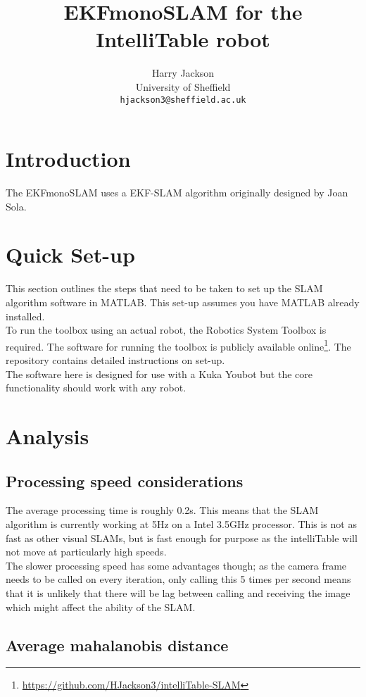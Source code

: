\documentclass[1pt, oneside]{article}
\title{EKFmonoSLAM for the IntelliTable robot}
\author{Harry Jackson
	\\University of Sheffield
	\\
	\texttt{hjackson3@sheffield.ac.uk}
	}
\begin{document}
\maketitle
\tableofcontents
\clearpage
\section{Introduction}
The EKFmonoSLAM uses a EKF-SLAM algorithm originally designed by Joan Sola\cite{sola2012impact, sola2008fusing}.
\section{Quick Set-up}
This section outlines the steps that need to be taken to set up the SLAM algorithm software in MATLAB. This set-up assumes you have MATLAB already installed.
\\

To run the toolbox using an actual robot, the Robotics System Toolbox is required. The software for running the toolbox is publicly available online\footnote{\url{https://github.com/HJackson3/intelliTable-SLAM}}. The repository contains detailed instructions on set-up.
\\

The software here is designed for use with a Kuka Youbot but the core functionality should work with any robot.

\section{Analysis}

\subsection{Processing speed considerations}
The average processing time is roughly 0.2s. This means that the SLAM algorithm is currently working at 5Hz on a Intel 3.5GHz processor. This is not as fast as other visual SLAMs\cite{davison2003real}, but is fast enough for purpose as the intelliTable will not move at particularly high speeds.
\\

The slower processing speed has some advantages though; as the camera frame needs to be called on every iteration, only calling this 5 times per second means that it is unlikely that there will be lag between calling and receiving the image which might affect the ability of the SLAM.

\subsection{Average mahalanobis distance}
\end{document}
